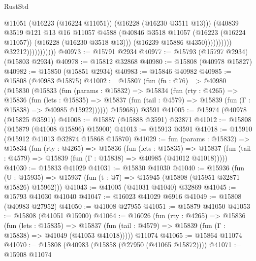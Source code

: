 \begin{lexlean}{RustStd}
\begin{coremodule}
                                            @11051
                                            (@16223 (@16224 @11051))
                                            (@16228 (@16230 @3511 @13)))
                                          (@40839
                                            @3519
                                            @121
                                            @13
                                            @16
                                            @11057
                                            @4588
                                            (@40846
                                              @3518
                                              @11057
                                              (@16223 (@16224 @11057))
                                              (@16228 (@16230 @3518 @13)))
                                            (@16239 @15886 @4350))))))))))
                          @32212)))))))))))
@40973 := @15791 @2934
@40977 := @15793 (@15797 @2934) (@15803 @2934)
@40978 := @15812 @32868
@40980 := @15808 (@40978 @15827)
@40982 := @15850 (@15851 @2934)
@40983 := @15846 @40982
@40985 := @15808 (@40983 @15875)
@41002 := @15807
    (fun (fn : @76) =>
    @40980
      (@15830
        (@15833
          (fun (params : @15832) =>
          @15834
            (fun (rty : @4265) =>
            @15836
              (fun (lets : @15835) =>
              @15837 (fun (tail : @4579) => @15839 (fun (Γ : @15838) => @40985 @15922))))))
        @15968))
    @3591
@41005 := @15974 (@40978 (@15825 @3591))
@41008 := @15887 (@15888 @3591) @32871
@41012 := @15808 (@15879 (@41008 @15896) @15900)
@41013 := @15913 @3591
@41018 := @15910 (@15912 @41013 @32874 @15868 @15870)
@41029 := fun (params : @15832) =>
  @15834
    (fun (rty : @4265) =>
    @15836
      (fun (lets : @15835) =>
      @15837 (fun (tail : @4579) => @15839 (fun (Γ : @15838) => @40985 (@41012 @41018)))))
@41030 := @15833 @41029
@41031 := @15830 @41030
@41040 := @15936
    (fun (U : @15935) => @15937 (fun (t : @7) => @15945 (@15808 (@15951 @32871 @15826) @15962)))
@41043 := @41005 (@41031 @41040) @32869
@41045 := @15793 @41030 @41040
@41047 := @16023 @41029 @6916
@41049 := @15808 (@40983 @27952)
@41050 := @41008 @27955
@41051 := @15879 @41050
@41053 := @15808 (@41051 @15900)
@41064 := @16026
    (fun (rty : @4265) =>
    @15836
      (fun (lets : @15835) =>
      @15837 (fun (tail : @4579) => @15839 (fun (Γ : @15838) => @41049 (@41053 @41018)))))
    @11074
@41065 := @15864 @11074
@41070 := @15808 (@40983 (@15858 (@27950 (@41065 @15872))))
@41071 := @15908 @11074

\end{coremodule}
\end{lexlean}
